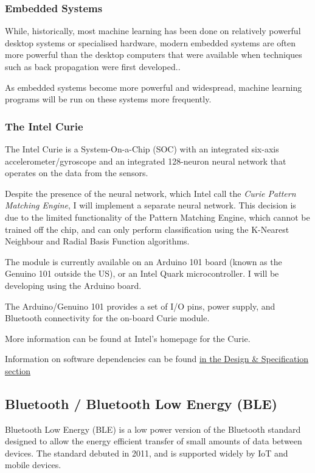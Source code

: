 \documentclass[a4paper]{article}
\begin{document}
\subsubsection{Embedded Systems}

While, historically, most machine learning has been done on relatively powerful desktop systems or specialised hardware, modern embedded systems are often more powerful than the desktop computers that were available when techniques such as back propagation were first developed.\cite{bgref5}. 

As embedded systems become more powerful and widespread, machine learning programs will be run on these systems more frequently.

\subsubsection{The Intel Curie}

The Intel Curie is a System-On-a-Chip (SOC) with an integrated six-axis accelerometer/gyroscope and an integrated 128-neuron neural network that operates on the data from the sensors.

Despite the presence of the neural network, which Intel call the \textit{Curie Pattern Matching Engine}\cite{bgref6}, I will implement a separate neural network. This decision is due to the limited functionality of the Pattern Matching Engine, which cannot be trained off the chip, and can only perform classification using the K-Nearest Neighbour and Radial Basis Function algorithms.

The module is currently available on an Arduino 101 board (known as the Genuino 101 outside the US), or an Intel Quark microcontroller. I will be developing using the Arduino board.

The Arduino/Genuino 101 provides a set of I/O pins, power supply, and Bluetooth connectivity for the on-board Curie module.

More information can be found at Intel's homepage for the Curie\cite{bgref6}.

Information on software dependencies can be found \hyperref[subsec:dn_language]{in the Design \& Specification section}

\newpage
\subsection{Bluetooth / Bluetooth Low Energy (BLE)}%
\label{subsec:bg_ble}

Bluetooth Low Energy\cite{bgref7} (BLE) is a low power version of the Bluetooth standard designed to allow the energy efficient transfer of small amounts of data between devices. The standard debuted in 2011, and is supported widely by IoT and mobile devices.
\end{document}
